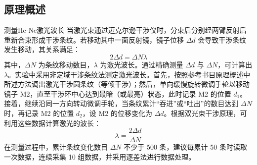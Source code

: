 \documentclass[dvipsnames, svgnames,a4paper,11pt]{article}
\begin{document}
\subsection{原理概述}
\begin{question}
	测量He-Ne激光波长
	\tcblower
	当激光束通过迈克尔逊干涉仪时，分束后分别经两臂反射后重新合束形成干涉条纹。若移动其中一面反射镜，镜子位移 \(\Delta d\) 会导致干涉条纹发生移动，其关系满足：
\[
2\Delta d = \Delta N\lambda\tag{1}
\]
其中，\(\Delta N\) 为条纹移动数目，\(\lambda\) 为激光波长。通过精确测量 \(\Delta d\) 与 \(\Delta N\)，可计算出 \(\lambda\)。实验中采用非定域干涉条纹法测定激光波长。首先，按照参考书目原理概述中所述方法调出激光干涉圆条纹（等倾干涉）；然后，单向缓慢旋转微调手轮以移动镜子 M2，直至干涉环中心达到最暗（或最亮）状态，此时记录 M2 的位置 \(d_1\)。接着，继续沿同一方向转动微调手轮，当条纹累计“吞进”或“吐出”的数目达到 \(\Delta N\) 时，再记录 M2 的位置 \(d_2\)，设 M2 的位移变化为 \(\Delta d\)。根据双光束干涉原理，可利用这些数据计算激光的波长：
\[
\lambda = \frac{2\Delta d}{\Delta N}\tag{2}
\]
在测量过程中，累计条纹变化数目 \(\Delta N\) 不少于 500 条，建议每累计 50 条时读取一次数据，连续采集 10 组数据，并采用逐差法进行数据处理。
\end{question}
\end{document}
